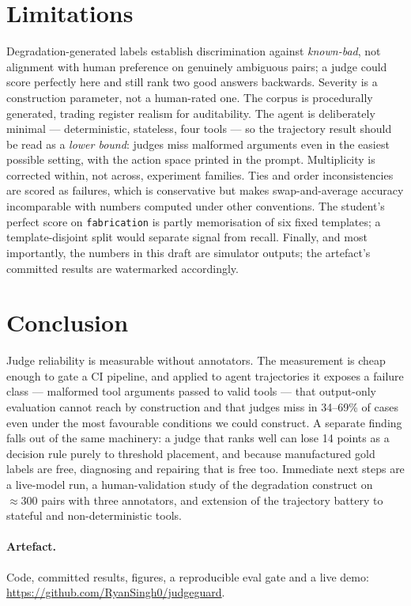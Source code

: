 \documentclass[10pt,letterpaper]{article}
\begin{document}
\section{Limitations}
\label{sec:limits}

Degradation-generated labels establish discrimination against \emph{known-bad}, not alignment with
human preference on genuinely ambiguous pairs; a judge could score perfectly here and still rank
two good answers backwards. Severity is a construction parameter, not a human-rated one. The
corpus is procedurally generated, trading register realism for auditability. The agent is
deliberately minimal --- deterministic, stateless, four tools --- so the trajectory result should
be read as a \emph{lower bound}: judges miss malformed arguments even in the easiest possible
setting, with the action space printed in the prompt. Multiplicity is corrected within, not
across, experiment families. Ties and order inconsistencies are scored as failures, which is
conservative but makes swap-and-average accuracy incomparable with numbers computed under other
conventions. The student's perfect score on \texttt{fabrication} is partly memorisation of six
fixed templates; a template-disjoint split would separate signal from recall. Finally, and most importantly, the numbers in this draft are simulator outputs; the
artefact's committed results are watermarked accordingly.

\section{Conclusion}

Judge reliability is measurable without annotators. The measurement is cheap enough to gate a CI
pipeline, and applied to agent trajectories it exposes a failure class --- malformed tool
arguments passed to valid tools --- that output-only evaluation cannot reach by construction and
that judges miss in 34--69\% of cases even under the most favourable conditions we could
construct. A separate finding falls out of the same machinery: a judge that ranks
well can lose 14 points as a decision rule purely to threshold placement, and because manufactured
gold labels are free, diagnosing and repairing that is free too. Immediate next steps are a live-model run, a
human-validation study of the degradation construct on $\approx 300$ pairs with three annotators,
and extension of the trajectory battery to stateful and non-deterministic tools.

\paragraph{Artefact.} Code, committed results, figures, a reproducible eval gate and a live demo:
\url{https://github.com/RyanSingh0/judgeguard}.



\end{document}
